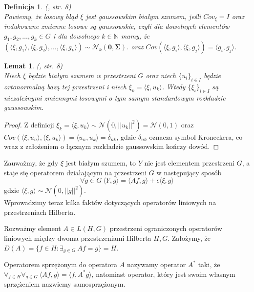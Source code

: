 \documentclass{mwart}
\newtheorem{df}{Definicja}
\newtheorem{lm}{Lemat}
\begin{document}
\begin{df}(\cite{iphde}, str. 8)\\
Powiemy, że losowy błąd $\xi$ jest gaussowskim białym szumem, jeśli $Cov_{\xi}=I$ oraz indukowane zmienne losowe są gaussowskie, czyli dla dowolnych elementów $g_1,g_2,\dots,g_k\in G$ i dla dowolnego $k\in \mathbb{N}$ mamy, że $(\langle \xi,g_1\rangle,\langle \xi,g_2\rangle,\dots,\langle \xi,g_k\rangle)\sim\mathcal{N}_k(\pmb{0},\pmb{\Sigma})$. oraz $Cov(\langle \xi,g_i\rangle , \langle \xi , g_j\rangle)=\langle g_i, g_j\rangle$.
\end{df}
\begin{lm}\label{lemat1}(\cite{iphde}, str. 8)\\
Niech $\xi$ będzie białym szumem w przestrzeni $G$ oraz niech $\{u_i\}_{i\in I}$ będzie ortonormalną bazą tej przestrzeni i niech $\xi_k=\langle \xi,u_k\rangle$. Wtedy $\{\xi_i\}_{i\in I}$ są niezależnymi zmiennymi losowymi o tym samym standardowym rozkładzie gaussowskim.
\end{lm}
\begin{proof}
Z definicji $\xi_k=\langle \xi,u_k\rangle\sim \mathcal{N}(0,||u_k||^2)=\mathcal{N}(0,1)$ oraz $Cov(\langle \xi, u_n\rangle,\langle \xi, u_k\rangle)=\langle u_n,u_k\rangle=\delta_{nk}$, gdzie $\delta_{nk}$ oznacza symbol Kroneckera, co wraz z założeniem o łącznym rozkładzie gaussowskim kończy dowód.
\end{proof}

Zauważmy, że gdy $\xi$ jest białym szumem, to $Y$ nie jest elementem przestrzeni $G$, a staje się operatorem działającym na przestrzeni $G$ w następujący sposób
\begin{displaymath}
\forall {g\in G}\ \langle Y,g\rangle =\langle Af,g\rangle + \epsilon\langle \xi, g\rangle
\end{displaymath}
gdzie $\langle \xi, g\rangle\sim\mathcal{N}(0,||g||^2)$.\\

Wprowadzimy teraz kilka faktów dotyczących operatorów liniowych na przestrzeniach Hilberta.

Rozważmy element $A\in L(H,G)$  przestrzeni ograniczonych operatorów liniowych między dwoma przestrzeniami Hilberta $H,G$. Założymy, że $D(A)=\{f\in H\colon \exists_{g\in G}\ Af=g\}=H$.

Operatorem sprzężonym do operatora $A$ nazywamy operator $A^*$ taki, że $\forall_{f\in H}\forall_{g\in G}\ \langle Af,g\rangle=\langle f,A^*g\rangle$, natomiast operator, który jest swoim własnym sprzężeniem nazwiemy samosprzężonym.
\end{document}
